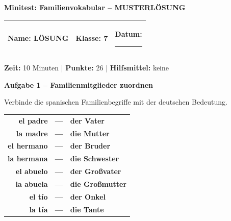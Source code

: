 \documentclass[11pt, a4paper]{article}
\newcommand{\fachfarbe}{spanisch}
\newcommand{\thema}{Minitest: Familienvokabular -- MUSTERLÖSUNG}
\newcommand{\klasse}{7}
\newcommand{\maxpunkte}{26}
\newcommand{\zeit}{10 Minuten}
\newcommand{\punktebox}[1]{\hfill\fbox{\small \_/#1}}
\newcommand{\luecke}[1]{\rule{#1}{0.4pt}}
\newcommand{\lsg}[1]{\textcolor{loesung}{\textbf{#1}}}
\newenvironment{aufgabe}[1]{%
    \needspace{5\baselineskip}%
    \nopagebreak[4]%
    \vspace{10pt}
    \noindent\textbf{\textcolor{\fachfarbe}{Aufgabe #1}}
    \nopagebreak[4]%
    \vspace{5pt}
    \nopagebreak[4]%
    \begin{list}{}{\leftmargin=0pt}
    \item[]
}{%
    \end{list}
}
\newcommand{\es}[1]{\textcolor{\fachfarbe}{\textbf{#1}}}
\begin{document}

\begin{center}
    {\Large\bfseries\textcolor{\fachfarbe}{\thema}}
\end{center}

\vspace{5pt}

\noindent
\begin{tabularx}{\textwidth}{|X|X|X|}
\hline
\textbf{Name:} \lsg{LÖSUNG} &
\textbf{Klasse:} \klasse &
\textbf{Datum:} \luecke{2cm} \\
\hline
\end{tabularx}

\vspace{10pt}

\begin{infobox}
\textbf{Zeit:} \zeit{} | \textbf{Punkte:} \maxpunkte{} | \textbf{Hilfsmittel:} keine
\end{infobox}

\vspace{15pt}


\begin{aufgabe}{1 -- Familienmitglieder zuordnen}
Verbinde die spanischen Familienbegriffe mit der deutschen Bedeutung. \punktebox{8}
\end{aufgabe}

\begin{center}
\begin{tabular}{rcl}
\es{el padre} & \lsg{---} & \lsg{der Vater} \\[0.8em]
\es{la madre} & \lsg{---} & \lsg{die Mutter} \\[0.8em]
\es{el hermano} & \lsg{---} & \lsg{der Bruder} \\[0.8em]
\es{la hermana} & \lsg{---} & \lsg{die Schwester} \\[0.8em]
\es{el abuelo} & \lsg{---} & \lsg{der Großvater} \\[0.8em]
\es{la abuela} & \lsg{---} & \lsg{die Großmutter} \\[0.8em]
\es{el tío} & \lsg{---} & \lsg{der Onkel} \\[0.8em]
\es{la tía} & \lsg{---} & \lsg{die Tante} \\
\end{tabular}
\end{center}
\end{document}
